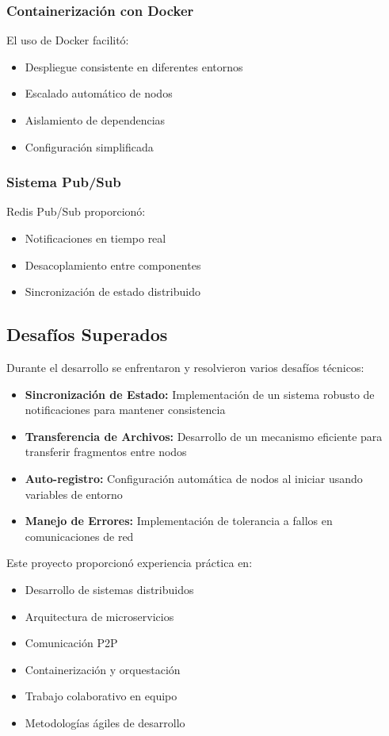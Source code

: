 \subsubsection*{Containerización con Docker}
El uso de Docker facilitó:
\begin{itemize}
    \item Despliegue consistente en diferentes entornos
    \item Escalado automático de nodos
    \item Aislamiento de dependencias
    \item Configuración simplificada
\end{itemize}

\subsubsection*{Sistema Pub/Sub}
Redis Pub/Sub proporcionó:
\begin{itemize}
    \item Notificaciones en tiempo real
    \item Desacoplamiento entre componentes
    \item Sincronización de estado distribuido
\end{itemize}

\subsection*{Desafíos Superados}

Durante el desarrollo se enfrentaron y resolvieron varios desafíos técnicos:

\begin{itemize}
    \item \textbf{Sincronización de Estado:} Implementación de un sistema robusto de notificaciones para mantener consistencia
    \item \textbf{Transferencia de Archivos:} Desarrollo de un mecanismo eficiente para transferir fragmentos entre nodos
    \item \textbf{Auto-registro:} Configuración automática de nodos al iniciar usando variables de entorno
    \item \textbf{Manejo de Errores:} Implementación de tolerancia a fallos en comunicaciones de red
\end{itemize}



Este proyecto proporcionó experiencia práctica en:

\begin{itemize}
    \item Desarrollo de sistemas distribuidos
    \item Arquitectura de microservicios
    \item Comunicación P2P
    \item Containerización y orquestación
    \item Trabajo colaborativo en equipo
    \item Metodologías ágiles de desarrollo
\end{itemize}


